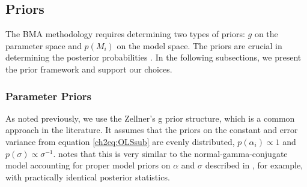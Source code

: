 \subsection{Priors} \label{ch2sec:priors}
The \ac{BMA} methodology requires determining two types of priors: $g$ on the parameter space and $p(M_{i})$ on the model space. The priors are crucial in determining the posterior probabilities \citep{FeldkircherZeugner2009,CicconeJarocinski2010,Liangetal2008}. In the following subsections, we present the prior framework and support our choices.

\subsubsection{Parameter Priors}
As noted previously, we use the Zellner's g prior structure, which is a common approach in the literature. It assumes that the priors on the constant and error variance from equation \ref{ch2eq:OLSsub} are evenly distributed, $p(\alpha_{i}) \propto 1$ and $p(\sigma) \propto \sigma^{-1}$. \citet{Zeugner2011} notes that this is very similar to the normal-gamma-conjugate model accounting for proper model priors on $\alpha$ and $\sigma$ described in \citet{Koop2003}, for example, with practically identical posterior statistics. 

